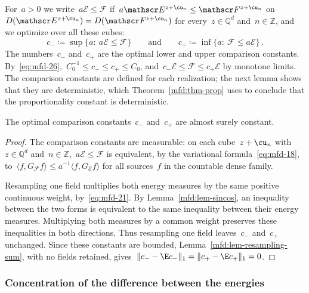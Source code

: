 \documentclass[11pt]{amsart}
\begin{document}
For~$a>0$ we write~$a\mathscr E\leq \mathscr F$ if~$a\mathscr E^{z+\cu_n}\leq \mathscr F^{z+\cu_n}$ on~$D(\mathscr E^{z+\cu_n})=D(\mathscr F^{z+\cu_n})$ for every~$z\in\mathbb Q^d$ and~$n\in\mathbb Z$, and we optimize over all these cubes:
\begin{equation*}
	c_-\coloneqq\sup\{a:\ a\mathscr E\leq \mathscr F\}\qquad\text{and}\qquad c_+\coloneqq\inf\{a:\ \mathscr F\leq a\mathscr E\}\,.
\end{equation*}
The numbers~$c_-$ and~$c_+$ are the optimal lower and upper comparison constants. By~\eqref{eq:mfd-26},~$C_0^{-1}\leq c_-\leq c_+\leq C_0$, and~$c_-\mathscr E\leq \mathscr F\leq c_+\mathscr E$ by monotone limits. The comparison constants are defined for each realization; the next lemma shows that they are deterministic, which Theorem~\ref{mfd:thm-prop} uses to conclude that the proportionality constant is deterministic.

\begin{lemma}
\label{mfd:lem-endpoints}
The optimal comparison constants~$c_-$ and~$c_+$ are almost surely constant.
\end{lemma}

\begin{proof}
The comparison constants are measurable: on each cube~$z+\cu_n$ with~$z\in\mathbb Q^d$ and~$n\in\mathbb Z$,~$a\mathscr E\leq \mathscr F$ is equivalent, by the variational formula~\eqref{eq:mfd-18}, to~$\langle f,G_{\mathscr F}f\rangle\leq a^{-1}\langle f,G_{\mathscr E}f\rangle$ for all sources~$f$ in the countable dense family.

\smallskip

Resampling one field multiplies both energy measures by the same positive continuous weight, by~\eqref{eq:mfd-21}. By Lemma~\ref{mfd:lem-sincos}, an inequality between the two forms is equivalent to the same inequality between their energy measures. Multiplying both measures by a common weight preserves these inequalities in both directions. Thus resampling one field leaves~$c_-$ and~$c_+$ unchanged. Since these constants are bounded, Lemma~\ref{mfd:lem-resampling-sum}, with no fields retained, gives~$\|c_--\E c_-\|_1=\|c_+-\E c_+\|_1=0$.
\end{proof}

\subsubsection{Concentration of the difference between the energies}
\end{document}
